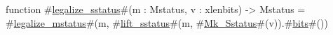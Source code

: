 function #\hyperref[sailRISCVzlegalizzezysstatus]{legalize\_sstatus}#(m : Mstatus, v : xlenbits) -> Mstatus = {
  #\hyperref[sailRISCVzlegalizzezymstatus]{legalize\_mstatus}#(m, #\hyperref[sailRISCVzliftzysstatus]{lift\_sstatus}#(m, #\hyperref[sailRISCVzMkzySstatus]{Mk\_Sstatus}#(v)).#\hyperref[sailRISCVzbits]{bits}#())
}
